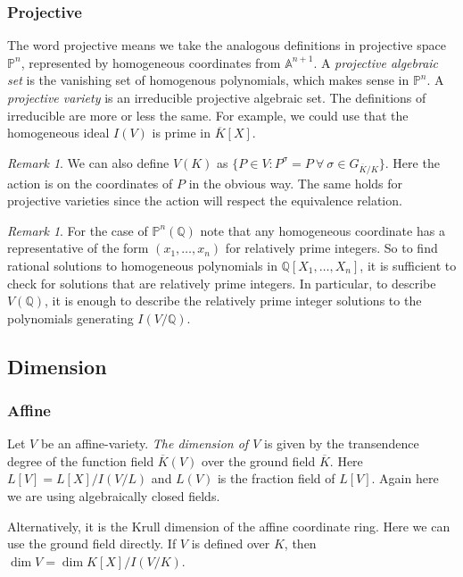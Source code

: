 \documentclass[11pt]{article}
\newcommand{\BB}[1]{\mathbb{#1}} %
\newcommand{\QQ}{\BB{Q}}
\newcommand{\PP}{\BB{P}}
\renewcommand{\AA}{\BB{A}} %
\newcommand{\st}{\colon}
\theoremstyle{plain}%
\theoremstyle{definition}
\theoremstyle{remark}
\newtheorem{rem}[thm]{Remark}
\begin{document}
\subsubsection{Projective}

The word projective means we take the analogous definitions in projective space $\PP^n$, represented by homogeneous coordinates from $\AA^{n+1}$. A \emph{projective algebraic set} is the vanishing set of homogenous polynomials, which makes sense in $\PP^n$. A \emph{projective variety} is an irreducible projective algebraic set. The definitions of irreducible are more or less the same. For example, we could use that the homogeneous ideal $I(V)$ is prime in $\overline{K}[X]$.


\begin{rem}
	We can also define $V(K)$ as $\{P\in V \st P^\sigma = P \ \forall \ \sigma\in G_{\overline{K}/K}\}$. Here the action is on the coordinates of $P$ in the obvious way. The same holds for projective varieties since the action will respect the equivalence relation.
\end{rem}

\begin{rem}
	For the case of $\PP^n(\QQ)$ note that any homogeneous coordinate has a representative of the form $(x_1,\dots,x_n)$ for relatively prime integers. So to find rational solutions to homogeneous polynomials in $\QQ[X_1,\dots,X_n]$, it is sufficient to check for solutions that are relatively prime integers. In particular, to describe $V(\QQ)$, it is enough to describe the relatively prime integer solutions to the polynomials generating $I(V/\QQ)$.
\end{rem}

\subsection{Dimension}

\subsubsection{Affine}

Let $V$ be an affine-variety. \emph{The dimension of $V$} is given by the transendence degree of the function field $\overline{K}(V)$ over the ground field $\overline{K}$. Here $L[V] = L[X]/I(V/L)$ and $L(V)$ is the fraction field of $L[V]$. Again here we are using algebraically closed fields.

Alternatively, it is the Krull dimension of the affine coordinate ring. %
Here we can use the ground field directly. If $V$ is defined over $K$, then $\dim V = \dim K[X]/I(V/K)$.
\end{document}
